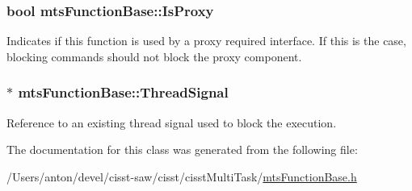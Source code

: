 \subsubsection[{Is\+Proxy}]{\setlength{\rightskip}{0pt plus 5cm}bool mts\+Function\+Base\+::\+Is\+Proxy\hspace{0.3cm}{\ttfamily [protected]}}\label{classmts_function_base_a9133290975dc1a3e0880bd72c5f975dc}
Indicates if this function is used by a proxy required interface. If this is the case, blocking commands should not block the proxy component. \hypertarget{classmts_function_base_a82055587f9a8d1d159c9b82da0bd7a16}{}
\subsubsection[{Thread\+Signal}]{$\ast$ mts\+Function\+Base\+::\+Thread\+Signal\hspace{0.3cm}{\ttfamily [protected]}}\label{classmts_function_base_a82055587f9a8d1d159c9b82da0bd7a16}
Reference to an existing thread signal used to block the execution. 

The documentation for this class was generated from the following file\+:\begin{DoxyCompactItemize}
\item 
/\+Users/anton/devel/cisst-\/saw/cisst/cisst\+Multi\+Task/\hyperlink{mts_function_base_8h}{mts\+Function\+Base.\+h}\end{DoxyCompactItemize}

